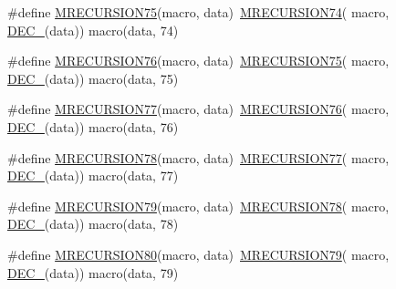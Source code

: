 \begin{DoxyCompactItemize}
\item 
\#define \mbox{\hyperlink{group__group__sam0__utils__mrecursion_ga224592c63d7b6799bab984a528ae4cc6}{M\+R\+E\+C\+U\+R\+S\+I\+O\+N75}}(macro,  data)~\mbox{\hyperlink{group__group__sam0__utils__mrecursion_ga8335acfacb3b7c1519b263cc873db045}{M\+R\+E\+C\+U\+R\+S\+I\+O\+N74}}(  macro, \mbox{\hyperlink{group__group__sam0__utils__mrecursion_ga1d23d683797679dca8c3512a54a5dcae}{D\+E\+C\+\_\+}}(data))   macro(data, 74)
\item 
\#define \mbox{\hyperlink{group__group__sam0__utils__mrecursion_gad42e6fecb9cedc9b4038fc3096c34bcd}{M\+R\+E\+C\+U\+R\+S\+I\+O\+N76}}(macro,  data)~\mbox{\hyperlink{group__group__sam0__utils__mrecursion_ga224592c63d7b6799bab984a528ae4cc6}{M\+R\+E\+C\+U\+R\+S\+I\+O\+N75}}(  macro, \mbox{\hyperlink{group__group__sam0__utils__mrecursion_ga1d23d683797679dca8c3512a54a5dcae}{D\+E\+C\+\_\+}}(data))   macro(data, 75)
\item 
\#define \mbox{\hyperlink{group__group__sam0__utils__mrecursion_gab51a9540134b976571d7ed113a047711}{M\+R\+E\+C\+U\+R\+S\+I\+O\+N77}}(macro,  data)~\mbox{\hyperlink{group__group__sam0__utils__mrecursion_gad42e6fecb9cedc9b4038fc3096c34bcd}{M\+R\+E\+C\+U\+R\+S\+I\+O\+N76}}(  macro, \mbox{\hyperlink{group__group__sam0__utils__mrecursion_ga1d23d683797679dca8c3512a54a5dcae}{D\+E\+C\+\_\+}}(data))   macro(data, 76)
\item 
\#define \mbox{\hyperlink{group__group__sam0__utils__mrecursion_ga44f0f6b328ba8fb25e23a395afb8da8a}{M\+R\+E\+C\+U\+R\+S\+I\+O\+N78}}(macro,  data)~\mbox{\hyperlink{group__group__sam0__utils__mrecursion_gab51a9540134b976571d7ed113a047711}{M\+R\+E\+C\+U\+R\+S\+I\+O\+N77}}(  macro, \mbox{\hyperlink{group__group__sam0__utils__mrecursion_ga1d23d683797679dca8c3512a54a5dcae}{D\+E\+C\+\_\+}}(data))   macro(data, 77)
\item 
\#define \mbox{\hyperlink{group__group__sam0__utils__mrecursion_ga5e756a7c7f7758383e87c19208a6090c}{M\+R\+E\+C\+U\+R\+S\+I\+O\+N79}}(macro,  data)~\mbox{\hyperlink{group__group__sam0__utils__mrecursion_ga44f0f6b328ba8fb25e23a395afb8da8a}{M\+R\+E\+C\+U\+R\+S\+I\+O\+N78}}(  macro, \mbox{\hyperlink{group__group__sam0__utils__mrecursion_ga1d23d683797679dca8c3512a54a5dcae}{D\+E\+C\+\_\+}}(data))   macro(data, 78)
\item 
\#define \mbox{\hyperlink{group__group__sam0__utils__mrecursion_gaa1146bb36552aac6b2de5b2a51f0d08c}{M\+R\+E\+C\+U\+R\+S\+I\+O\+N80}}(macro,  data)~\mbox{\hyperlink{group__group__sam0__utils__mrecursion_ga5e756a7c7f7758383e87c19208a6090c}{M\+R\+E\+C\+U\+R\+S\+I\+O\+N79}}(  macro, \mbox{\hyperlink{group__group__sam0__utils__mrecursion_ga1d23d683797679dca8c3512a54a5dcae}{D\+E\+C\+\_\+}}(data))   macro(data, 79)

\end{DoxyCompactItemize}
